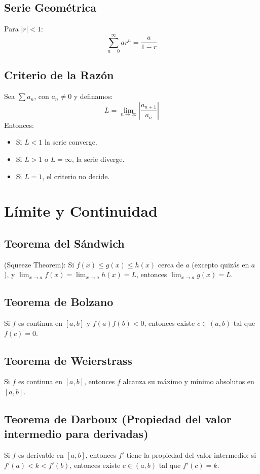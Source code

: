 \documentclass[12pt]{article}
\begin{document}
\subsection{Serie Geométrica}
Para $|r| < 1$:
\[
\sum_{n=0}^\infty ar^n = \frac{a}{1 - r}
\]

\subsection{Criterio de la Razón}
Sea $\sum a_n$, con $a_n \neq 0$ y definamos:
\[
L = \lim_{n \to \infty} \left|\frac{a_{n+1}}{a_n}\right|
\]
Entonces:
\begin{itemize}
  \item Si $L < 1$ la serie converge.
  \item Si $L > 1$ o $L = \infty$, la serie diverge.
  \item Si $L = 1$, el criterio no decide.
\end{itemize}









\newpage
\section{Límite y Continuidad}

\subsection{Teorema del Sándwich}
(Squeeze Theorem): Si $f(x) \leq g(x) \leq h(x)$ cerca de $a$ (excepto quizás en $a$), y $\lim_{x \to a} f(x) = \lim_{x \to a} h(x) = L$, entonces $\lim_{x \to a} g(x) = L$.

\subsection{Teorema de Bolzano}
Si $f$ es continua en $[a,b]$ y $f(a)f(b) < 0$, entonces existe $c \in (a,b)$ tal que $f(c) = 0$.

\subsection{Teorema de Weierstrass}
Si $f$ es continua en $[a,b]$, entonces $f$ alcanza su máximo y mínimo absolutos en $[a,b]$.

\subsection{Teorema de Darboux (Propiedad del valor intermedio para derivadas)}
Si $f$ es derivable en $[a,b]$, entonces $f'$ tiene la propiedad del valor intermedio: si $f'(a) < k < f'(b)$, entonces existe $c \in (a,b)$ tal que $f'(c) = k$.
\end{document}
